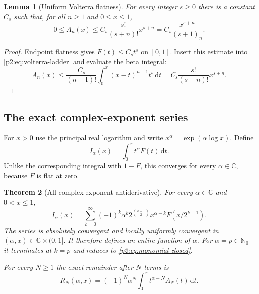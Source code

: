 \documentclass[11pt,oneside]{article}
\newtheorem{theorem}{Theorem}[section]
\newtheorem{lemma}[theorem]{Lemma}
\theoremstyle{definition}
\theoremstyle{remark}
\newcommand{\C}{\mathbb C}
\newcommand{\N}{\mathbb N}
\newcommand{\dd}{\,\mathrm d}
\newcommand{\fall}[2]{#1^{\underline{#2}}}
\newcommand{\1}{\mathbf 1}
\begin{document}
\begin{lemma}[Uniform Volterra flatness]
\label{p2:lem:volterra-flatness}
For every integer $s\ge0$ there is a constant $C_s$ such that, for all
$n\ge1$ and $0\le x\le1$,
\begin{equation}
 0\le A_n(x)\le C_s\frac{s!}{(s+n)!}x^{s+n}
 =C_s\frac{x^{s+n}}{(s+1)_n}.                              \label{p2:eq:An-flat-bound}
\end{equation}
\end{lemma}

\begin{proof}
Endpoint flatness gives $F(t)\le C_st^s$ on $[0,1]$.  Insert this estimate into
\eqref{p2:eq:volterra-ladder} and evaluate the beta integral:
\[
 A_n(x)\le\frac{C_s}{(n-1)!}\int_0^x(x-t)^{n-1}t^s\dd t
 =C_s\frac{s!}{(s+n)!}x^{s+n}.
\]
\end{proof}

\subsection{The exact complex-exponent series}
For $x>0$ use the principal real logarithm and write $x^\alpha=
\exp(\alpha\log x)$.  Define
\begin{equation}
 I_\alpha(x)=\int_0^xt^\alpha F(t)\dd t.                  \label{p2:eq:Ialpha-def}
\end{equation}
Unlike the corresponding integral with $1-F$, this converges for every
$\alpha\in\C$, because $F$ is flat at zero.

\begin{theorem}[All-complex-exponent antiderivative]
\label{p2:thm:complex-series}
For every $\alpha\in\C$ and $0<x\le1$,
\begin{equation}
 \boxed{
 I_\alpha(x)=\sum_{k=0}^{\infty}(-1)^k\fall{\alpha}{k}
 2^{\binom{k+1}{2}}x^{\alpha-k}F(x/2^{k+1}).}              \label{p2:eq:complex-series}
\end{equation}
The series is absolutely convergent and locally uniformly convergent in
$(\alpha,x)\in\C\times(0,1]$.  It therefore defines an entire function of
$\alpha$.  For $\alpha=p\in\N_0$ it terminates at $k=p$ and reduces to
\eqref{p2:eq:monomial-closed}.

For every $N\ge1$ the exact remainder after $N$ terms is
\begin{equation}
 R_N(\alpha,x)=(-1)^N\fall{\alpha}{N}
 \int_0^xt^{\alpha-N}A_N(t)\dd t.                          \label{p2:eq:complex-remainder}
\end{equation}
\end{theorem}
\end{document}
